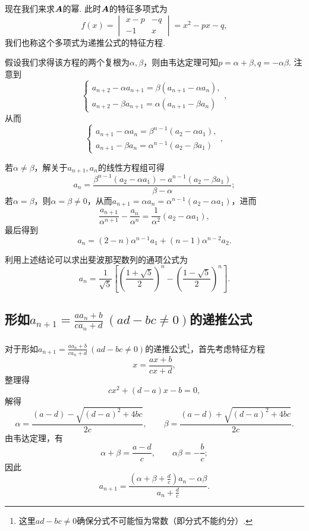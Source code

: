 现在我们来求\(\boldsymbol{A}\)的幂.
此时\(\boldsymbol{A}\)的特征多项式为\[
f(x) = \begin{vmatrix}
x-p & -q \\
-1 & x
\end{vmatrix} = x^2 - px - q,
\]我们也称这个多项式为递推公式的特征方程.

假设我们求得该方程的两个复根为\(\alpha,\beta\)，则由韦达定理可知\(p=\alpha+\beta, q=-\alpha\beta\).
注意到\[
\left\{ \begin{array}{l}
a_{n+2} - \alpha a_{n+1} = \beta(a_{n+1}-\alpha a_n), \\
a_{n+2} - \beta a_{n+1} = \alpha(a_{n+1}-\beta a_n)
\end{array} \right.,
\]从而\[
\left\{ \begin{array}{l}
a_{n+1} - \alpha a_n = \beta^{n-1} (a_2 - \alpha a_1), \\
a_{n+1} - \beta a_n = \alpha^{n-1} (a_2 - \beta a_1)
\end{array} \right.,
\]

若\(\alpha\neq\beta\)，解关于\(a_{n+1},a_n\)的线性方程组可得\[
a_n = \frac{\beta^{n-1} (a_2 - \alpha a_1) - a^{n-1} (a_2 - \beta a_1)}{\beta-\alpha};
\]
若\(\alpha=\beta\)，则\(\alpha=\beta\neq0\)，从而\(a_{n+1} = \alpha a_n = \alpha^{n-1} (a_2 - \alpha a_1)\)，进而\[
\frac{a_{n+1}}{\alpha^{n+1}} - \frac{a_n}{\alpha^n} = \frac{1}{\alpha^2}(a_2-\alpha a_1),
\]最后得到\[
a_n = (2-n)\alpha^{n-1} a_1 + (n-1) \alpha^{n-2} a_2.
\]

利用上述结论可以求出斐波那契数列的通项公式为\[
a_n = \frac{1}{\sqrt{5}} \left[
\left(\frac{1+\sqrt{5}}{2}\right)^n
-\left(\frac{1-\sqrt{5}}{2}\right)^n
\right].
\]

\subsection{\texorpdfstring{形如\(a_{n+1} = \frac{a a_n + b}{c a_n + d}\ (ad-bc\neq0)\)的递推公式}{第二类递推公式}}
对于形如\(a_{n+1} = \frac{a a_n + b}{c a_n + d}\ (ad-bc\neq0)\)的递推公式\footnote{这里\(ad-bc\neq0\)确保分式不可能恒为常数（即分式不能约分）.}，首先考虑特征方程\[
x = \frac{ax+b}{cx+d},
\]整理得\[
cx^2+(d-a)x-b=0,
\]解得\[
\alpha=\frac{(a-d)-\sqrt{(d-a)^2+4bc}}{2c}, \qquad
\beta=\frac{(a-d)+\sqrt{(d-a)^2+4bc}}{2c}.
\]由韦达定理，有\[
\alpha+\beta=\frac{a-d}{c}, \qquad
\alpha\beta=-\frac{b}{c};
\]因此\[
a_{n+1} = \frac{\left(\alpha+\beta+\frac{d}{c}\right) a_n - \alpha\beta}{a_n + \frac{d}{c}}.
\]

